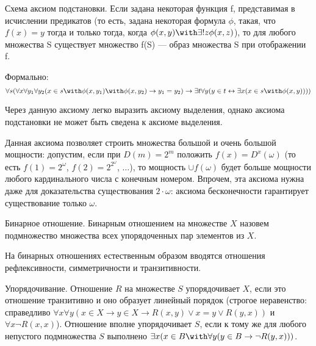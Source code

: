 \begin{axiom}{Схема аксиом подстановки.}
Если задана некоторая функция f, представимая в исчислении предикатов
(то есть, задана некоторая формула $\phi$, такая, что $f(x) = y$
тогда и только тогда, когда $\phi(x,y) \with \exists ! z \phi(x,z)$),
то для любого множества S существует множество f(S) --- образ
множества S при отображении f.

Формально: 
$$\forall s (\forall x \forall y_1 \forall y_2 (x \in s \with \phi (x,y_1) \with \phi
(x,y_2) \rightarrow y_1=y_2) \rightarrow 
\exists t \forall y (y \in t 
\leftrightarrow \exists x (x \in s \with \phi (x,y)))) $$
\end{axiom}

Через данную аксиому легко выразить аксиому выделения,
%
однако аксиома подстановки не может быть сведена к аксиоме выделения.

Данная аксиома позволяет строить множества большой и очень большой мощности:
допустим, если при $D(m)=2^m$ положить $f(x) = D^x(\omega)$ 
(то есть $f(1) = 2^\omega$, $f(2) = 2^{2^\omega}$, $\dots$), 
то мощность $\cup f(\omega)$ будет больше мощности
любого кардинального числа с конечным номером.
Впрочем, эта аксиома нужна даже для доказательства
существования $2 \cdot \omega$: аксиома бесконечности гарантирует
существование только $\omega$.

\begin{definition}{Бинарное отношение.}
Бинарным отношением на множестве $X$ назовем подмножество множества
всех упорядоченных пар элементов из $X$.
\end{definition}

На бинарных отношениях естественным образом вводятся отношения 
рефлексивности, симметричности и транзитивности.

\begin{definition}{Упорядочивание.}
Отношение $R$ на множестве $S$ упорядочивает $X$, если это отношение
транзитивно и оно образует линейный порядок 
(строгое неравенство: справедливо
$\forall x \forall y (x \in X \rightarrow y \in X \rightarrow R(x,y) \vee x =
y \vee R(y,x))$ и
$\forall x \neg R(x,x)$).
Отношение вполне упорядочивает $S$, если к тому же для любого 
непустого подмножества $S$ выполнено 
$\exists x (x \in B \with \forall y (y \in B \rightarrow \neg R(y,x)))$.
\end{definition}

